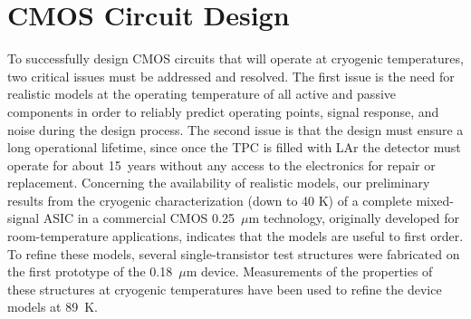 
%
%

\section{CMOS Circuit Design}
\label{sec:fe_CMOS}

To successfully design CMOS circuits that will operate at cryogenic 
temperatures, two critical issues must be addressed and resolved. 
The first issue is the need for realistic models at the operating temperature 
of all active and passive components in order to reliably predict operating points,
signal response, and noise during the design process.
The second issue is that the design must ensure a long operational lifetime, since once the TPC is filled 
with LAr the detector must operate for about 15~years without any access to the 
electronics for repair or replacement.
Concerning the availability of realistic models, 
our preliminary results from the cryogenic characterization (down to 40 K) of a complete 
mixed-signal ASIC \cite{CMOS-Compton} in a commercial CMOS 0.25~$\mu$m technology, 
originally developed for room-temperature applications, indicates that the models 
are useful to first order.
To refine these models, several 
single-transistor test structures were fabricated on the first prototype of the 0.18~$\mu$m device. 
Measurements of the properties of these structures at cryogenic temperatures 
have been used to refine the device models at 89~K. 

